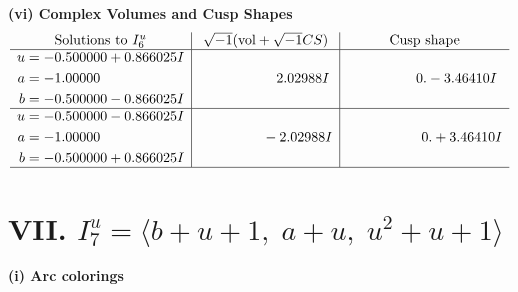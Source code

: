 \documentclass[1p]{elsarticle_modified}
\theoremstyle{definition}
\newcommand{\I}{\sqrt{-1}}
\begin{document}
\newpage\flushleft \textbf{(vi) Complex Volumes and Cusp Shapes}
$$\begin{array}{c|c|c}  
\text{Solutions to }I^u_{6}& \I (\text{vol} + \sqrt{-1}CS) & \text{Cusp shape}\\
 \hline 
\begin{aligned}
u &= -0.500000 + 0.866025 I \\
a &= -1.00000\phantom{ +0.000000I} \\
b &= -0.500000 - 0.866025 I\end{aligned}
 & \phantom{-0.000000 -}2.02988 I & \phantom{-0.000000 } 0. - 3.46410 I \\ \hline\begin{aligned}
u &= -0.500000 - 0.866025 I \\
a &= -1.00000\phantom{ +0.000000I} \\
b &= -0.500000 + 0.866025 I\end{aligned}
 & \phantom{-0.000000 } -2.02988 I & \phantom{-0.000000 -}0. + 3.46410 I\\
 \hline 
 \end{array}$$\newpage\newpage\renewcommand{\arraystretch}{1}
\centering \section*{VII. $I^u_{7}= \langle b+u+1,\;a+u,\;u^2+u+1 \rangle$}
\flushleft \textbf{(i) Arc colorings}\\
\end{document}
